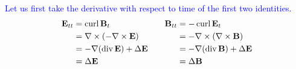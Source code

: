 \documentclass[10pt,a4paper]{report}
\newcommand{\BLUE}[1]{\textcolor{blue}{#1}}
\newcommand{\CURL}{\operatorname{curl}}
\newcommand{\DIV}{\operatorname{div}}
\begin{document}
\begin{enumerate}
\BLUE{
Let us first take the derivative with respect to time of the first two identities.
\begin{align*}
	\EE_{tt} &=	 \CURL \BB_t &\quad \BB_{tt} &= - \CURL \EE_t \\
	&= \nabla \times (-\nabla \times \EE) &\quad &= - \nabla \times (\nabla \times \BB) \\
	&= -\nabla(\DIV \EE)+\Delta \EE &\quad &= -\nabla(\DIV \BB) + \Delta \EE \\
	&= \Delta \EE &\quad &= \Delta \BB
\end{align*}
}

\end{enumerate}
\end{document}
